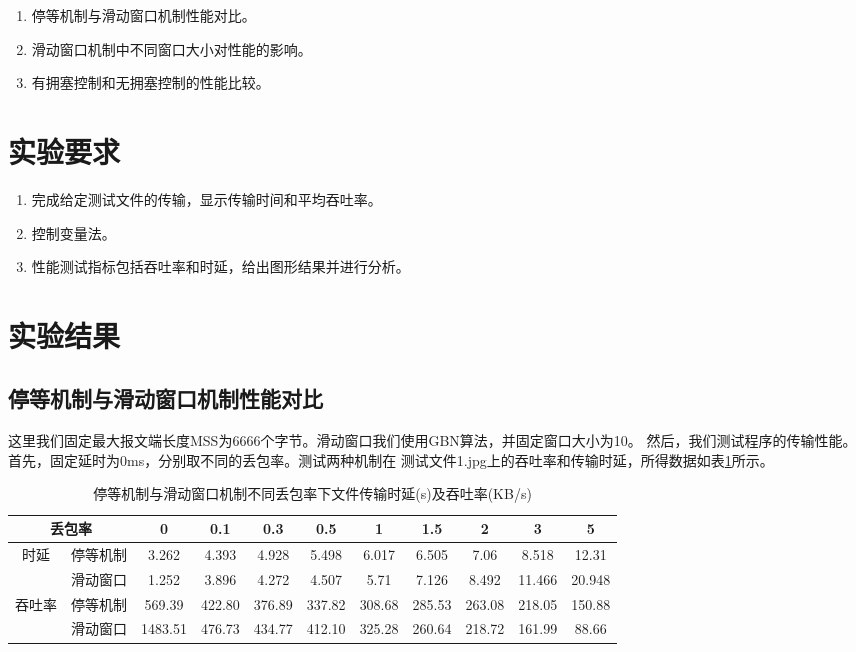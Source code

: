 \documentclass[a4paper]{article}
\begin{document}
\begin{enumerate}
    \item 停等机制与滑动窗口机制性能对比。
    \item 滑动窗口机制中不同窗口大小对性能的影响。
    \item 有拥塞控制和无拥塞控制的性能比较。
\end{enumerate}

\section{实验要求}

\begin{enumerate}
    \item 完成给定测试文件的传输，显示传输时间和平均吞吐率。
    \item 控制变量法。
    \item 性能测试指标包括吞吐率和时延，给出图形结果并进行分析。
\end{enumerate}

\section{实验结果}

\subsection{停等机制与滑动窗口机制性能对比}

这里我们固定最大报文端长度MSS为6666个字节。滑动窗口我们使用GBN算法，并固定窗口大小为10。
然后，我们测试程序的传输性能。首先，固定延时为0ms，分别取不同的丢包率。测试两种机制在
测试文件1.jpg上的吞吐率和传输时延，所得数据如表\ref{table:1}所示。

\begin{table}[!htbp]
\centering
\begin{tabular}{|cc|c|c|c|c|c|c|c|c|c|}
\hline
\multicolumn{2}{|c|}{丢包率} & 0 & 0.1 & 0.3 & 0.5 & 1 & 1.5 & 2 & 3 & 5 \\ \hline
\multicolumn{1}{|c|}{\multirow{2}{*}{时延}} & 停等机制 & 3.262 & 4.393 & 4.928 & 5.498 & 6.017 & 6.505 & 7.06 & 8.518 & 12.31 \\ \cline{2-11} 
\multicolumn{1}{|c|}{} & 滑动窗口 & 1.252 & 3.896 & 4.272 & 4.507 & 5.71 & 7.126 & 8.492 & 11.466 & 20.948 \\ \hline
\multicolumn{1}{|c|}{\multirow{2}{*}{吞吐率}} & 停等机制 & 569.39 & 422.80 & 376.89 & 337.82 & 308.68 & 285.53 & 263.08 & 218.05 & 150.88 \\ \cline{2-11} 
\multicolumn{1}{|c|}{} & 滑动窗口 & 1483.51 & 476.73 & 434.77 & 412.10 & 325.28 & 260.64 & 218.72 & 161.99 & 88.66 \\ \hline
\end{tabular}
\caption{停等机制与滑动窗口机制不同丢包率下文件传输时延(s)及吞吐率(KB/s)}
\label{table:1}
\end{table}
\end{document}
